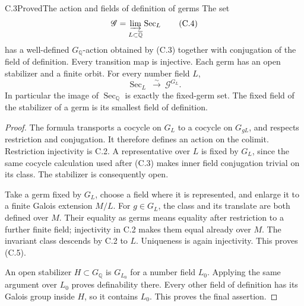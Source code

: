\begin{statement}{C.3}{Proved}{The action and fields of definition of germs}
The set
\[
          \mathscr G=\varinjlim_{L\subset\overline{\mathbb Q}}
                                      \operatorname{Sec}_L
                                                               \tag{C.4}
\]
has a well-defined $G_{\mathbb Q}$-action obtained by
(C.3) together with conjugation of the field of definition.
Every transition map is injective.  Each germ has an open
stabilizer and a finite orbit.  For every number field $L$,
\[
       \operatorname{Sec}_L\ \xrightarrow{\sim}\
                                    \mathscr G^{G_L}.          \tag{C.5}
\]
In particular the image of $\operatorname{Sec}_{\mathbb Q}$
is exactly the fixed-germ set.  The fixed field of the
stabilizer of a germ is its smallest field of definition.
\end{statement}
\begin{proof}
The formula transports a cocycle on $G_L$ to a cocycle on
$G_{gL}$, and respects restriction and conjugation.
It therefore defines an action on the colimit.
Restriction injectivity is C.2.  A representative over
$L$ is fixed by $G_L$, since the same cocycle calculation
used after (C.3) makes inner field conjugation trivial
on its class.  The stabilizer is consequently open.

Take a germ fixed by $G_L$, choose a field where it is
represented, and enlarge it to a finite Galois extension
$M/L$.  For $g\in G_L$, the class and its translate are
both defined over $M$.  Their equality as germs means
equality after restriction to a further finite field;
injectivity in C.2 makes them equal already over $M$.
The invariant class descends by C.2 to $L$.  Uniqueness
is again injectivity.  This proves (C.5).

An open stabilizer $H\subset G_{\mathbb Q}$ is $G_{L_0}$
for a number field $L_0$.  Applying the same argument
over $L_0$ proves definability there.  Every other field
of definition has its Galois group inside $H$, so it
contains $L_0$.  This proves the final assertion.
\end{proof}

